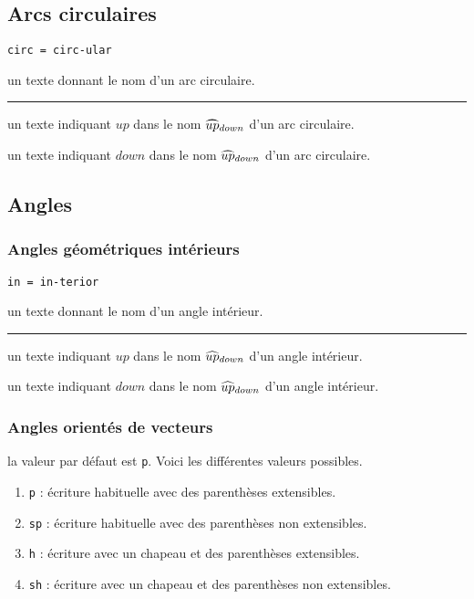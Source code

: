 \documentclass[12pt,a4paper]{article}
\theoremstyle{definition}
\newcommand\separation{
    \medskip
    \hfill\rule{0.5\textwidth}{0.75pt}\hfill
    \medskip
}
\newcommand\mwhyprefix[2]{%
    \texttt{#1 = #1-#2}%
}
\begin{document}
\subsection{Arcs circulaires}



 \hfill \mwhyprefix{circ}{ular}

\IDarg{} un texte donnant le nom d'un arc circulaire.


\separation



 un texte indiquant $up$ dans le nom $\circarc*{up}{down}$ d'un arc circulaire.

 un texte indiquant $down$ dans le nom $\circarc*{up}{down}$ d'un arc circulaire.


\subsection{Angles}

\subsubsection{Angles géométriques \og intérieurs \fg}



  \hfill \mwhyprefix{in}{terior}

\IDarg{} un texte donnant le nom d'un angle intérieur.


\separation



 un texte indiquant $up$ dans le nom $\anglein*{up}{down}$ d'un angle intérieur.

 un texte indiquant $down$ dans le nom $\anglein*{up}{down}$ d'un angle intérieur.


\subsubsection{Angles orientés de vecteurs}




\IDoption{} la valeur par défaut est \verb+p+.  Voici les différentes valeurs possibles.
\begin{enumerate}
	\item \verb+p+ : écriture habituelle avec des parenthèses extensibles.

	\item \verb+sp+ : écriture habituelle avec des parenthèses non extensibles.

	\item \verb+h+ : écriture avec un chapeau et des parenthèses extensibles.

	\item \verb+sh+ : écriture avec un chapeau et des parenthèses non extensibles.
\end{enumerate}
\end{document}
